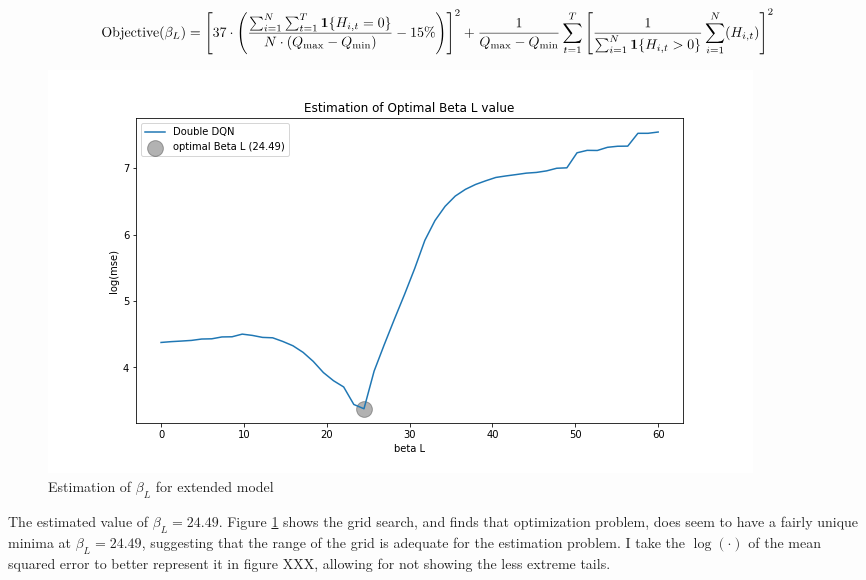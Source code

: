 \begin{equation}
   \text{Objective}(\beta_L) =  \left[ 37 \cdot \left(\frac{\sum_{i=1}^{N} \sum_{t=1}^T \mathbf{1}\{H_{i,t} = 0\}}{ N \cdot (Q_{\max} - Q_{\min} )} - 15\% \right) \right]^2 + \frac{1}{Q_{\max} - Q_{\min}}\sum_{t=1}^{T} \left[ \frac{1}{\sum_{i=1}^{N} \mathbf{1}\{H_{i,t} > 0\}}\sum_{i=1}^N (H_{i,t})\right]^2
\end{equation}

\begin{figure}[ht]
    \centering
    \includegraphics[scale=0.4]{figures/ddqn_extended_model_estimation_beta_L.png}
    \caption{Estimation of $\beta_L$ for extended model}
    \label{fig:estimation_extended}
\end{figure}

The estimated value of $\beta_L = 24.49$. Figure \ref{fig:estimation_extended} shows the grid search, and finds that optimization problem, does seem to have a fairly unique minima at $\beta_L = 24.49$, suggesting that the range of the grid is adequate for the estimation problem. I take the $\log (\cdot)$ of the mean squared error to better represent it in figure XXX, allowing for not showing the less extreme tails.